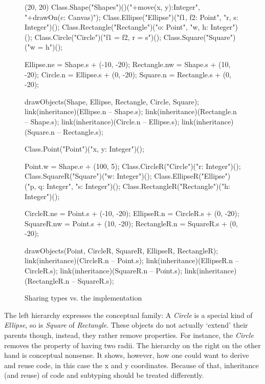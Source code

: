 \begin{figure}[H]
	\centering
	\begin{emp}[classdiag](20, 20)
		Class.Shape("Shapes")()("+move(x, y):Integer", "+drawOn(c: Canvas)");
		Class.Ellipse("Ellipse")("f1, f2: Point", "r, s: Integer")();
		Class.Rectangle("Rectangle")("o: Point", "w, h: Integer")();
		Class.Circle("Circle")("{f1 = f2, r = s}")();
		Class.Square("Square")("{w = h}")();

		Ellipse.ne = Shape.s + (-10, -20);
		Rectangle.nw = Shape.s + (10, -20);
		Circle.n = Ellipse.s + (0, -20);
		Square.n = Rectangle.s + (0, -20);

		drawObjects(Shape, Ellipse, Rectangle, Circle, Square);
		link(inheritance)(Ellipse.n -- Shape.s);
		link(inheritance)(Rectangle.n -- Shape.s);
		link(inheritance)(Circle.n -- Ellipse.s);
		link(inheritance)(Square.n -- Rectangle.s);

		Class.Point("Point")("x, y: Integer")();

		Point.w = Shape.e + (100, 5);
		Class.CircleR("Circle")("r: Integer")();
		Class.SquareR("Square")("w: Integer")();
		Class.EllipseR("Ellipse")("p, q: Integer", "s: Integer")();
		Class.RectangleR("Rectangle")("h: Integer")();

		CircleR.ne = Point.s + (-10, -20);
		EllipseR.n = CircleR.s + (0, -20);
		SquareR.nw = Point.s + (10, -20);
		RectangleR.n = SquareR.s + (0, -20);

		drawObjects(Point, CircleR, SquareR, EllipseR, RectangleR);
		link(inheritance)(CircleR.n -- Point.s);
		link(inheritance)(EllipseR.n -- CircleR.s);
		link(inheritance)(SquareR.n -- Point.s);
		link(inheritance)(RectangleR.n -- SquareR.s);

	\end{emp}
	\caption{Sharing types vs. the implementation}
	\label{fig:implementationConflict}
\end{figure}

The left hierarchy expresses the conceptual family: A \emph{Circle}
is a special kind of \emph{Ellipse}, so is \emph{Square} of
\emph{Rectangle}. These objects do not actually `extend' their
parents though, instead, they rather remove properties. For instance, the
\emph{Circle} removes the property of having two radii.	The hierarchy on
the right on the other hand is conceptual nonsense. It shows, however,
how one could want to derive and reuse code, in this case the x and
y coordinates. Because of that, inheritance (and reuse) of code and
subtyping should be treated differently.

